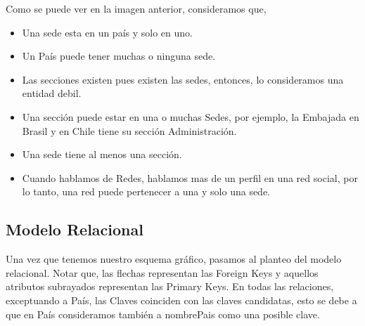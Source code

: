 \documentclass[10pt,a4paper]{article}
\begin{document}
Como se puede ver en la imagen anterior, consideramos que,

\begin{itemize}
	\item Una sede esta en un país y solo en uno.
	\item Un País puede tener muchas o ninguna sede.
	\item Las secciones existen pues existen las sedes, entonces, lo consideramos una entidad debil.
	\item Una sección puede estar en una o muchas Sedes, por ejemplo, la Embajada en Brasil y en Chile tiene su sección Administración.
	\item Una sede tiene al menos una sección.
	\item Cuando hablamos de Redes, hablamos mas de un perfil en una red social, por lo tanto, una red puede pertenecer a una y solo una sede.
\end{itemize}


\subsection{Modelo Relacional} \vspace{0.2cm}

Una vez que tenemos nuestro esquema gráfico, pasamos al planteo del modelo relacional. Notar que, las flechas representan las Foreign Keys y aquellos atributos 
subrayados representan las Primary Keys. En todas las relaciones, exceptuando a País, las Claves coinciden con las claves candidatas, esto se debe a que en País consideramos también a 
nombrePais como una posible clave.  \vspace{0.4cm}

\newbox\ubox
\end{document}
